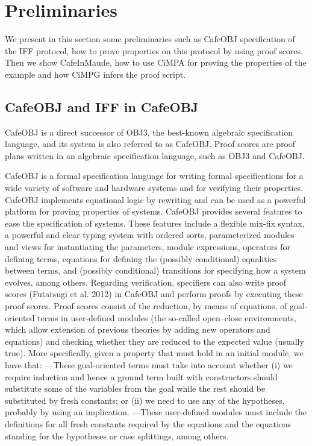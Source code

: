 \documentclass[a4paper,fleqn]{cas-dc}
\begin{document}

\section{Preliminaries}\label{pre}
We present in this section some preliminaries such as
CafeOBJ specification of the IFF protocol, how to prove properties on this protocol by using proof scores. Then we show CafeInMaude, how to use CiMPA for proving the properties of the example and how CiMPG infers the proof script.

\subsection{CafeOBJ and IFF in CafeOBJ} \label{cafeobj}
CafeOBJ \cite{DiaconescuF98amast} is a direct successor of OBJ3, the best-known algebraic specification language, and its system is also referred to as CafeOBJ. Proof scores are proof plans written in an algebraic specification language, such as OBJ3 and CafeOBJ.

CafeOBJ is a formal specification language for writing formal specifications for a wide variety of software and hardware systems and for verifying their properties. CafeOBJ implements equational logic by rewriting and can be used as a powerful platform for proving properties of systems. CafeOBJ provides several features to ease the specification of systems. These features include a flexible mix-fix syntax, a powerful and clear typing system with ordered sorts, parameterized modules and views for instantiating the parameters, module expressions, operators for defining terms, equations for defining the (possibly conditional) equalities
between terms, and (possibly conditional) transitions for specifying how a system evolves, among others. Regarding verification, specifiers can also write proof scores (Futatsugi et al. 2012) in CafeOBJ and perform proofs by executing these proof scores. Proof scores consist of the reduction, by
means of equations, of goal-oriented terms in user-defined modules (the so-called open–close environments, which allow extension of previous theories by adding new operators and equations) and checking whether they are reduced to the expected value (usually true). More specifically, given a property that must hold in an initial module, we have that:
—These goal-oriented terms must take into account whether (i) we require induction and
hence a ground term built with constructors should substitute some of the variables from
the goal while the rest should be substituted by fresh constants; or (ii) we need to use any
of the hypotheses, probably by using an implication.
—These user-defined modules must include the definitions for all fresh constants required
by the equations and the equations standing for the hypotheses or case splittings, among
others.
\end{document}
